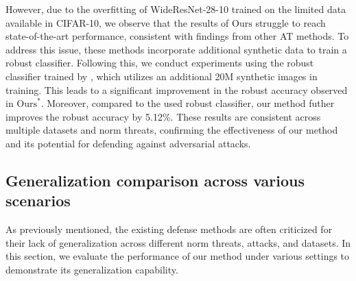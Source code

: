 However, due to the overfitting of WideResNet-28-10 trained on the limited data available in CIFAR-10, we observe that the results of $\text{Ours}$ struggle to reach state-of-the-art performance, consistent with findings from other AT methods. To address this issue, these methods incorporate additional synthetic data to train a robust classifier. Following this, we conduct experiments using the robust classifier trained by \citet{cui2024decoupled}, which utilizes an additional 20M synthetic images in training. This leads to a significant improvement in the robust accuracy observed in $\text{Ours}^*$. 
Moreover, compared to the used robust classifier, our method futher improves the robust accuracy by 5.12\%.
These results are consistent across multiple datasets and norm threats, confirming the effectiveness of our method and its potential for defending against adversarial attacks.




\subsection{Generalization comparison across various scenarios}
\label{Comparison across multiple cases}
As previously mentioned, the existing defense methods are often criticized for their lack of generalization across different norm threats, attacks, and datasets. In this section, we evaluate the performance of our method under various settings to demonstrate its generalization capability.

